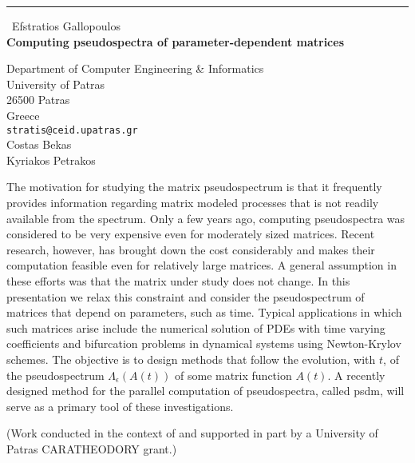 \documentclass{report}
\begin{document}
\begin{center}
\rule{6in}{1pt} \
{\large Efstratios Gallopoulos \\
{\bf Computing pseudospectra of parameter-dependent matrices}}

Department of Computer Engineering & Informatics \\ University of Patras \\ 26500 Patras \\ Greece
\\
{\tt stratis@ceid.upatras.gr}\\
Costas Bekas\\
Kyriakos Petrakos\end{center}

The motivation for studying the matrix pseudospectrum is that it
frequently provides information regarding matrix modeled processes that
is not readily available from the spectrum. Only a few years ago,
computing pseudospectra was considered to be very expensive even for
moderately sized matrices. Recent research, however, has brought down the
cost considerably and makes their computation feasible even for
relatively large matrices. A general assumption in these efforts was that
the matrix under study does not change. In this presentation we relax
this constraint and consider the pseudospectrum of matrices that depend
on parameters, such as time. Typical applications in which such matrices
arise include the numerical solution of PDEs with time varying
coefficients and bifurcation problems in dynamical systems using
Newton-Krylov schemes. The objective is to design methods that follow the
evolution, with $t$, of the pseudospectrum $\Lambda_\epsilon(A(t))$ of
some matrix function $A(t)$. A recently designed method for the parallel
computation of pseudospectra, called {\sc psdm}, will serve as a primary
tool of these investigations.


(Work conducted in the context of and supported in part by a University
of Patras CARATHEODORY grant.)
\end{document}
